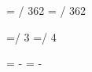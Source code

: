 
\tempdimen=\dimexpr {} / 362\relax
\tempdimentwo=\dimexpr {} / 362\relax

\tempdimen=\dimexpr \tempdimen / 3\relax
\tempdimentwo=\dimexpr \tempdimen / 4\relax

\spaceonedim=\dimexpr 48pt - \tempdimen\relax
\spacetwodim=\dimexpr 34pt - \tempdimentwo\relax

\newcommand{\spaceone}{\the\spaceonedim}
\newcommand{\spacetwo}{\the\spacetwodim}


